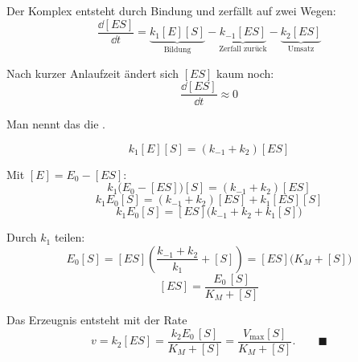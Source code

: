 \begin{merksatz}
Der Komplex entsteht durch Bindung und zerfällt auf zwei Wegen:
\[ \frac{\dd[ES]}{\dd t} = \underbrace{k_1[E][S]}_{\text{Bildung}} - \underbrace{k_{-1}[ES]}_{\text{Zerfall zurück}} - \underbrace{k_2[ES]}_{\text{Umsatz}} \]

Nach kurzer Anlaufzeit ändert sich $[ES]$ kaum noch:
\[ \frac{\dd[ES]}{\dd t} \approx 0 \]

Man nennt das die .

\begin{center}
\begin{minipage}{0.88\textwidth}
\end{minipage}
\end{center}

\[ k_1[E][S] = (k_{-1}+k_2)[ES] \]

Mit $[E] = E_0 - [ES]$:
\[ k_1\bigl(E_0 - [ES]\bigr)[S] = (k_{-1}+k_2)[ES] \]
\[ k_1E_0[S] = (k_{-1}+k_2)[ES] + k_1[ES][S] \]
\[ k_1E_0[S] = [ES]\bigl(k_{-1}+k_2+k_1[S]\bigr) \]

Durch $k_1$ teilen:
\[ E_0[S] = [ES]\left(\frac{k_{-1}+k_2}{k_1} + [S]\right) = [ES]\bigl(K_M + [S]\bigr) \]
\[ [ES] = \frac{E_0\,[S]}{K_M+[S]} \]

Das Erzeugnis entsteht mit der Rate
\[ v = k_2[ES] = \frac{k_2E_0\,[S]}{K_M+[S]} = \frac{V_{\max}[S]}{K_M+[S]} . \qquad \blacksquare \]
\end{merksatz}


